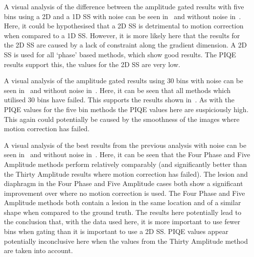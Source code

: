             A visual analysis of the difference between the amplitude gated results with five bins using a \gls{2D} and a \gls{1D} \gls{SS} with noise can be seen in~ and without noise in~. Here, it could be hypothesised that a \gls{2D} \gls{SS} is detrimental to motion correction when compared to a \gls{1D} \gls{SS}. However, it is more likely here that the results for the \gls{2D} \gls{SS} are caused by a lack of constraint along the gradient dimension. A \gls{2D} \gls{SS} is used for all `phase' based methods, which show good results. The \gls{PIQE} results support this, the values for the \gls{2D} \gls{SS} are very low.
            
            A visual analysis of the amplitude gated results using $30$ bins with noise can be seen in~ and without noise in~. Here, it can be seen that all methods which utilised $30$ bins have failed. This supports the results shown in~. As with the \gls{PIQE} values for the five bin methods the \gls{PIQE} values here are suspiciously high. This again could potentially be caused by the smoothness of the images where motion correction has failed.
            
            A visual analysis of the best results from the previous analysis with noise can be seen in~ and without noise in~. Here, it can be seen that the Four Phase and Five Amplitude methods perform relatively comparably (and significantly better than the Thirty Amplitude results where motion correction has failed). The lesion and diaphragm in the Four Phase and Five Amplitude cases both show a significant improvement over where no motion correction is used. The Four Phase and Five Amplitude methods both contain a lesion in the same location and of a similar shape when compared to the ground truth. The results here potentially lead to the conclusion that, with the data used here, it is more important to use fewer bins when gating than it is important to use a \gls{2D} \gls{SS}. \gls{PIQE} values appear potentially inconclusive here when the values from the Thirty Amplitude method are taken into account.

